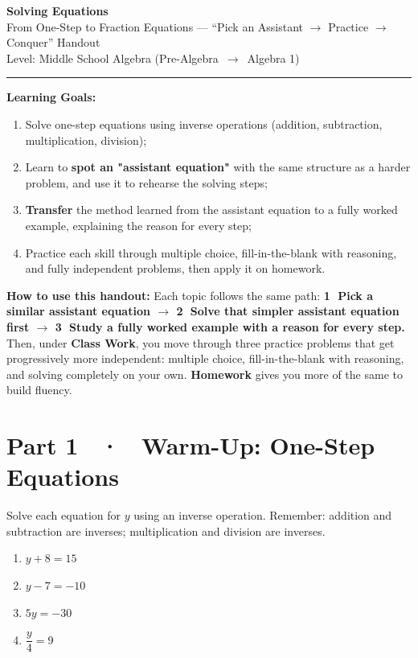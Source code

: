 \documentclass[11pt]{article}
\begin{document}
\begin{center}
  {\Huge\bfseries\color{brandred} Solving Equations}\\[2mm]
  {\large\color{brandblue} From One-Step to Fraction Equations --- ``Pick an Assistant $\to$ Practice $\to$ Conquer'' Handout}\\[1mm]
  {\small Level: Middle School Algebra (Pre-Algebra \,$\to$\, Algebra 1)}
\end{center}

\vspace{2mm}
\hrule
\vspace{3mm}

{\bfseries Learning Goals:}
\begin{enumerate}[itemsep=1pt, topsep=2pt]
  \item Solve one-step equations using inverse operations (addition, subtraction, multiplication, division);
  \item Learn to \textbf{spot an "assistant equation"} with the same structure as a harder problem, and use it to rehearse the solving steps;
  \item \textbf{Transfer} the method learned from the assistant equation to a fully worked example, explaining the reason for every step;
  \item Practice each skill through multiple choice, fill-in-the-blank with reasoning, and fully independent problems, then apply it on homework.
\end{enumerate}

{\bfseries How to use this handout:} Each topic follows the same path: \textbf{\textcircled{\small 1} Pick a similar assistant equation $\to$ \textcircled{\small 2} Solve that simpler assistant equation first $\to$ \textcircled{\small 3} Study a fully worked example with a reason for every step.} Then, under \textbf{Class Work}, you move through three practice problems that get progressively more independent: multiple choice, fill-in-the-blank with reasoning, and solving completely on your own. \textbf{Homework} gives you more of the same to build fluency.

\section*{Part 1 \ · \ Warm-Up: One-Step Equations}

\begin{warmbox}
Solve each equation for $y$ using an inverse operation. Remember: addition and subtraction are inverses; multiplication and division are inverses.
\begin{enumerate}[label=(\alph*), itemsep=3pt]
  \item $y + 8 = 15$
  \item $y - 7 = -10$
  \item $5y = -30$
  \item $\dfrac{y}{4} = 9$
\end{enumerate}
\end{warmbox}
\end{document}

